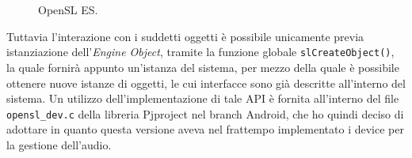 \begin{figure}[thp]
\centering
{}\\
\\
\caption{OpenSL ES.}
\label{fig:Opensles}
\end{figure}

Tuttavia l'interazione con i suddetti oggetti è possibile unicamente previa
istanziazione dell'\textit{Engine Object}, tramite la funzione globale \texttt{\small slCreateObject()},
la quale fornirà appunto un'istanza del sistema, per mezzo della quale è possibile 
ottenere nuove istanze di oggetti, le cui interfacce sono già descritte all'interno
del sistema. Un utilizzo dell'implementazione di tale API è fornita all'interno
del file \texttt{\small opensl\_dev.c} della libreria Pjproject nel branch Android,
che ho quindi deciso di adottare in quanto questa versione aveva nel frattempo 
implementato i device per la gestione dell'audio.


